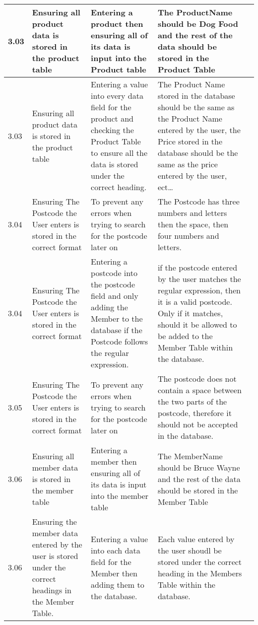 \begin{flushleft}
\begin{longtable}{|p{1cm}|p{2.5cm}|p{2.5cm}|p{2cm}|p{2cm}|}
	\rowcolor{dark-grey}3.03 & Ensuring all product data is stored in the product table & Entering a product then ensuring all of its data is input into the Product table  & The ProductName should be Dog Food and the rest of the data should be stored in the Product Table & \\ \hline
	\rowcolor{light-grey}3.03 & Ensuring all product data is stored in the product table & Entering a value into every data field for the product and checking the Product Table to ensure all the data is stored under the correct heading.  & The Product Name stored in the database should be the same as the Product Name entered by the user, the Price stored in the database should be the same as the price entered by the user, ect\ldots & \\ \hline
	\rowcolor{dark-grey}3.04 & Ensuring The Postcode the User enters is stored in the correct format  & To prevent any errors when trying to search for the postcode later on  & The Postcode has three numbers and letters then the space, then four numbers and letters. & \\ \hline
	\rowcolor{light-grey}3.04 & Ensuring The Postcode the User enters is stored in the correct format  & Entering a postcode into the postcode field and only adding the Member to the database if the Postcode follows the regular expression. &if the postcode entered by the user matches the regular expression, then it is a valid postcode. Only if it matches, should it be allowed to be added to the Member Table within the database.& \\ \hline
	\rowcolor{dark-grey}3.05 & Ensuring The Postcode the User enters is stored in the correct format  & To prevent any errors when trying to search for the postcode later on  & The postcode does not contain a space between the two parts of the postcode, therefore it should not be accepted in the database. & \\ \hline
	\rowcolor{dark-grey}3.06 & Ensuring all member data is stored in the member table & Entering a member then ensuring all of its data is input into the member table  & The MemberName should be Bruce Wayne  and the rest of the data should be stored in the Member Table & \\ \hline
	\rowcolor{light-grey}3.06 & Ensuring the member data entered by the user is stored under the correct headings in the Member Table. & Entering a value into each data field for the Member then adding them to the database. & Each value entered by the user shoudl be stored under the correct heading in the Members Table within the database. & \\ \hline

\end{longtable}
\end{flushleft}
